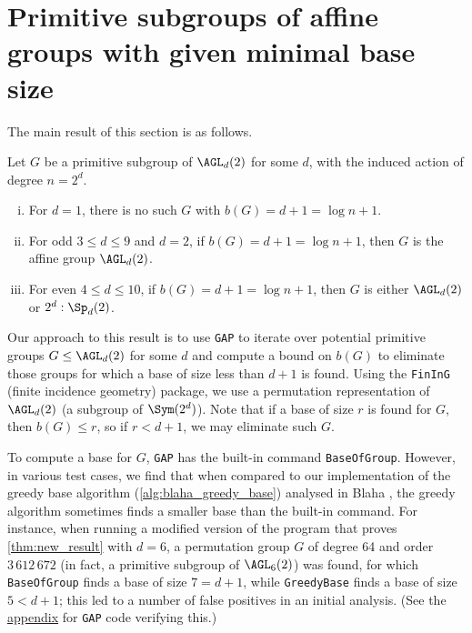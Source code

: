 \section{Primitive subgroups of affine groups with given minimal base size}

The main result of this section is as follows.

\begin{theorem}\label{thm:new_result}
    Let $G$ be a primitive subgroup of $\AGL_d(2)$ for some $d$, with the induced action of degree $n = 2^d$.
    \begin{enumerate}[(i)]
        \item For $d = 1$, there is no such $G$ with $b(G) = d + 1 = \log n + 1$.
        \item For odd $3 \leq d \leq 9$ and $d = 2$, if $b(G) = d + 1 = \log n + 1$, then $G$ is the affine group $\AGL_d(2)$.
        \item For even $4 \leq d \leq 10$, if $b(G) = d + 1 = \log n + 1$, then $G$ is either $\AGL_d(2)$ or $2^d : \Sp_d(2)$.
    \end{enumerate}
\end{theorem}

Our approach to this result is to use \texttt{GAP} to iterate over potential primitive groups $G \leq \AGL_d(2)$ for some $d$ and compute a bound on $b(G)$ to eliminate those groups for which a base of size less than $d + 1$ is found. Using the \texttt{FinInG} (finite incidence geometry) package, we use a permutation representation of $\AGL_d(2)$ (a subgroup of $\Sym(2^d)$). Note that if a base of size $r$ is found for $G$, then $b(G) \leq r$, so if $r < d + 1$, we may eliminate such $G$.

To compute a base for $G$, \texttt{GAP} has the built-in command \texttt{BaseOfGroup}. However, in various test cases, we find that when compared to our implementation of the greedy base algorithm (\autoref{alg:blaha_greedy_base}) analysed in Blaha \cite{blaha1992}, the greedy algorithm sometimes finds a smaller base than the built-in command. For instance, when running a modified version of the program that proves \autoref{thm:new_result} with $d = 6$, a permutation group $G$ of degree 64 and order $3\,612\,672$ (in fact, a primitive subgroup of $\AGL_6(2)$) was found, for which \texttt{BaseOfGroup} finds a base of size $7 = d + 1$, while \texttt{GreedyBase} finds a base of size $5 < d + 1$; this led to a number of false positives in an initial analysis. (See the \hyperref[app:greedy_better_than_default]{appendix} for \texttt{GAP} code verifying this.)

